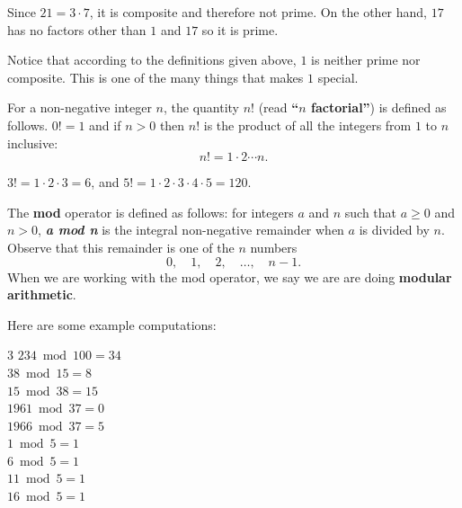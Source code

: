 \begin{exa}
Since $21=3\cdot 7$, it is composite and therefore not prime.
On the other hand, $17$ has no factors other than $1$ and $17$ so it is prime.
\end{exa}

\begin{rem}
Notice that according to the definitions given above, $1$ is neither prime nor composite.
This is one of the many things that makes $1$ special.
\end{rem}

\begin{df}
For a non-negative integer $n$, the quantity $n!$ (read {\bf ``$n$ factorial''}) is defined as follows.
$0! = 1$ and if $n>0$ then $n!$ is the product of all the integers from $1$ to $n$ inclusive: $$n! = 1\cdot 2 \cdots n.  $$
\end{df}

\begin{exa}
$3! = 1\cdot 2 \cdot 3 = 6$, and 
$5! = 1\cdot 2 \cdot 3 \cdot 4 \cdot 5 = 120$. 
\end{exa}

\begin{df}
The  {\bf mod} operator is defined as follows: for 
integers $a$ and $n$ such that $a\geq 0$ and $n>0$, 
{\bf\em a mod n}
is the integral non-negative remainder
when $a$ is divided by $n$.  Observe that this remainder is one of
the $n$ numbers $$0,\quad  1,\quad  2,\quad  \ldots , \quad n-1.$$
When we are working with the mod operator, we say we are
are doing {\bf modular arithmetic}.
\end{df}

\begin{exa} 
Here are some example computations: \\[-.35in]
\begin{multicols}{3} \columnsep 25pt
\noindent
$234 \bmod 100 = 34$\\
$38 \bmod 15 = 8$\\
$15 \bmod 38 = 15$\\
$ 1961 \bmod 37 = 0$\\
$ 1966 \bmod 37 = 5$\\
$ 1\bmod 5 = 1$\\
$6\bmod 5 =1 $\\
$11\bmod 5 = 1$\\
$16\bmod 5 = 1$
\end{multicols}
\end{exa}


